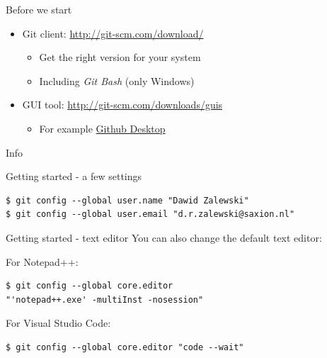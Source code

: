 \documentclass[
  11pt,
  american,
  ignorenonframetext,
  aspectratio=43,
  compress,
  xcolor=dvipsnames]{beamer}
\providecommand{\tightlist}{%
  \setlength{\itemsep}{0pt}\setlength{\parskip}{0pt}}
\begin{document}
\begin{frame}{Before we start}
\protect\hypertarget{before-we-start}{}
\begin{itemize}
\tightlist
\item
  Git client: \url{http://git-scm.com/download/}

  \begin{itemize}
  \tightlist
  \item
    Get the right version for your system
  \item
    Including \emph{Git Bash} (only Windows)
  \end{itemize}
\item
  GUI tool: \url{http://git-scm.com/downloads/guis}

  \begin{itemize}
  \tightlist
  \item
    For example \href{https://desktop.github.com/}{Github Desktop}
  \end{itemize}
\end{itemize}

\begin{block}{Info}
\end{block}
\end{frame}

\begin{frame}[fragile]{Getting started - a few settings}
\protect\hypertarget{getting-started---a-few-settings}{}
\begin{verbatim}
$ git config --global user.name "Dawid Zalewski"
$ git config --global user.email "d.r.zalewski@saxion.nl"
\end{verbatim}
\end{frame}

\begin{frame}[fragile]{Getting started - text editor}
\protect\hypertarget{getting-started---text-editor}{}
You can also change the default text editor:

For Notepad++:

\begin{verbatim}
$ git config --global core.editor 
"'notepad++.exe' -multiInst -nosession"
\end{verbatim}

For Visual Studio Code:

\begin{verbatim}
$ git config --global core.editor "code --wait"
\end{verbatim}
\end{frame}
\end{document}
